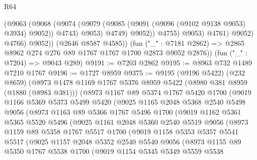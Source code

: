 \begin{lexlean}{R64}
\begin{coremodule}
                        (@9063
                          (@9068
                            (@9074
                              (@9079 (@9085 (@9091 (@9096 (@9102 @9138 @9053) @3934) @9052)) @4743)
                              @9053)
                            @4749)
                          @9052))
                      @4755)
                    @9053)
                  @4761)
                @9052)
              @4766)
            @9052))
        (@2646 @8587 @4585))
      (fun ("_" : @7181 @2862) => @2865 @8962 @274 @276 @89 @1767 @1767 @1700 @2873 @9052 @2876))
    (fun ("_" : @7204) => @9043 @289)
@9191 := @7203 @2862
@9195 := @8963 @732 @1489 @7210 @1767
@9196 := @1727 @8959
@9375 := @9195
    (@9196 @5422)
    (@232 @8659)
    (@8973
      @1478
      @1169
      @1767
      @5376
      @8959
      @5422
      (@8980 @381 @8959 (@1880 (@8983 @381)))
      (@8973
        @1167
        @89
        @5374
        @1767
        @5420
        @1700
        (@9019
          @1166
          @5369
          @5373
          @5499
          @5420
          (@9025
            @1165
            @2048
            @5368
            @2540
            @5498
            @9056
            (@8973
              @1163
              @89
              @5366
              @1767
              @5496
              @1700
              (@9019
                @1162
                @5361
                @5365
                @5520
                @5496
                (@9025
                  @1161
                  @2048
                  @5360
                  @2540
                  @5519
                  @9056
                  (@8973
                    @1159
                    @89
                    @5358
                    @1767
                    @5517
                    @1700
                    (@9019
                      @1158
                      @5353
                      @5357
                      @5541
                      @5517
                      (@9025
                        @1157
                        @2048
                        @5352
                        @2540
                        @5540
                        @9056
                        (@8973
                          @1155
                          @89
                          @5350
                          @1767
                          @5538
                          @1700
                          (@9019
                            @1154
                            @5345
                            @5349
                            @5559
                            @5538

\end{coremodule}
\end{lexlean}
